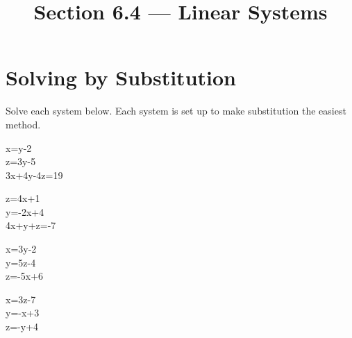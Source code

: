 

\title{Section 6.4 --- Linear Systems}


\maketitle

\section*{Solving by Substitution}
Solve each system below. Each system is set up to make substitution the easiest method.
\begin{smenum}
\maitemxx
{\begin{System}
x=y-2\\
z=3y-5\\
3x+4y-4z=19
\end{System}}
{\begin{System}
z=4x+1\\
y=-2x+4\\
4x+y+z=-7
\end{System}}
\maitemxx
{\begin{System}
x=3y-2\\
y=5z-4\\
z=-5x+6
\end{System}}
{\begin{System}
x=3z-7\\
y=-x+3\\
z=-y+4
\end{System}}
\end{smenum}

